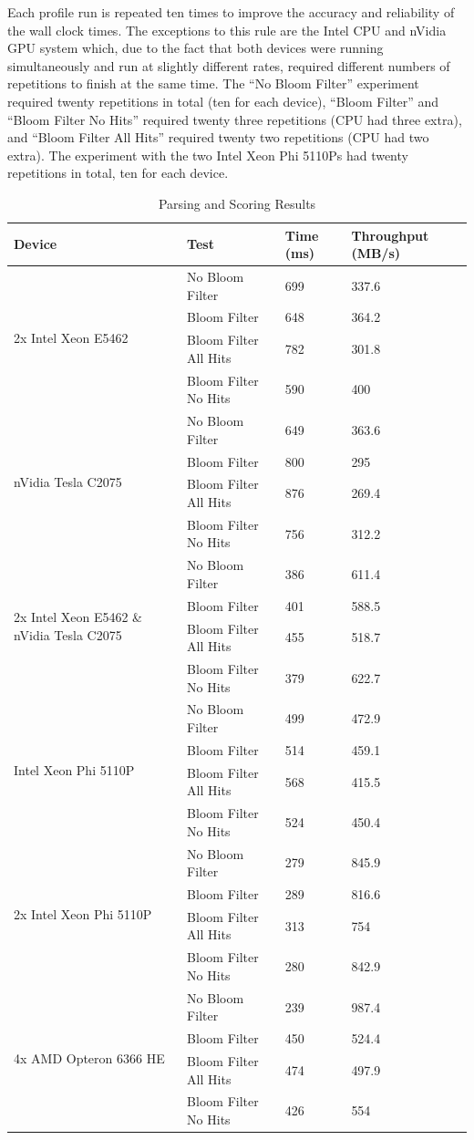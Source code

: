 Each profile run is repeated ten times to improve the accuracy and reliability
of the wall clock times. The exceptions to this rule are the Intel CPU and
nVidia GPU system which, due to the fact that both devices were running
simultaneously and run at slightly different rates, required different numbers
of repetitions to finish at the same time. The ``No Bloom Filter'' experiment
required twenty repetitions in total (ten for each device), ``Bloom Filter'' and
``Bloom Filter No Hits'' required twenty three repetitions (CPU had three
extra), and ``Bloom Filter All Hits'' required twenty two repetitions (CPU had
two extra). The experiment with the two Intel Xeon Phi 5110Ps had twenty
repetitions in total, ten for each device.

\begin{table}[H]
\begin{tabular}{|l|l|l|l|}
\hline
Device & Test & Time (ms) & Throughput (MB/s)\\
\hline
\multirow{4}{*}{2x Intel Xeon E5462}
& No Bloom Filter & 699 & 337.6 \\
& Bloom Filter & 648 & 364.2 \\
& Bloom Filter All Hits & 782 & 301.8 \\
& Bloom Filter No Hits & 590 & 400 \\
\hline
\multirow{4}{*}{nVidia Tesla C2075}
& No Bloom Filter & 649 & 363.6 \\
& Bloom Filter & 800 & 295 \\
& Bloom Filter All Hits & 876 & 269.4 \\
& Bloom Filter No Hits & 756 & 312.2 \\
\hline
\multirow{4}{*}{2x Intel Xeon E5462 \& nVidia Tesla C2075}
& No Bloom Filter & 386 & 611.4 \\
& Bloom Filter & 401 & 588.5 \\
& Bloom Filter All Hits & 455 & 518.7 \\
& Bloom Filter No Hits & 379 & 622.7 \\
\hline
\multirow{4}{*}{Intel Xeon Phi 5110P}
& No Bloom Filter & 499 & 472.9 \\
& Bloom Filter & 514 & 459.1 \\
& Bloom Filter All Hits & 568 & 415.5 \\
& Bloom Filter No Hits & 524 & 450.4 \\
\hline
\multirow{4}{*}{2x Intel Xeon Phi 5110P}
& No Bloom Filter & 279 & 845.9 \\
& Bloom Filter & 289 & 816.6 \\
& Bloom Filter All Hits & 313 & 754 \\
& Bloom Filter No Hits & 280 & 842.9 \\
\hline
\multirow{4}{*}{4x AMD Opteron 6366 HE}
& No Bloom Filter & 239 & 987.4 \\
& Bloom Filter & 450 & 524.4 \\
& Bloom Filter All Hits & 474 & 497.9 \\
& Bloom Filter No Hits & 426 & 554 \\
\hline
\end{tabular}
\caption{Parsing and Scoring Results}
\label{table:parsingScoring}
\end{table}

